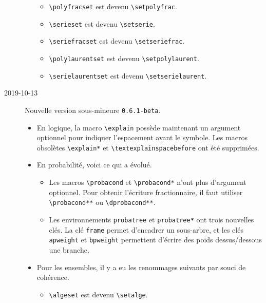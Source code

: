 \documentclass[12pt,a4paper]{article}
\newcommand\env[1]{\texttt{#1}}
\newcommand\macro[1]{\env{\textbackslash{}#1}}
\theoremstyle{definition}
\begin{document}
\begin{description}
\begin{itemize}[itemsep=.5em]
\begin{itemize}[itemsep=.5em]
            \item \macro{polyfracset} est devenu \macro{setpolyfrac}.
    
            \item \macro{serieset} est devenu \macro{setserie}.
    
            \item \macro{seriefracset} est devenu \macro{setseriefrac}.
    
            \item \macro{polylaurentset} est devenu \macro{setpolylaurent}.
    
            \item \macro{serielaurentset} est devenu \macro{setserielaurent}.
        \end{itemize}
    \end{itemize}


    \medskip
    \item[2019-10-13] Nouvelle version sous-mineure \verb+0.6.1-beta+.
    
    \begin{itemize}[itemsep=.5em]
        \item En logique, la macro \macro{explain} possède maintenant un argument optionnel pour indiquer l'espacement avant le symbole. Les macros obsolètes \macro{explain*} et \macro{textexplainspacebefore} ont été supprimées.
    
    
        \item En probabilité, voici ce qui a évolué.
        \begin{itemize}[itemsep=.5em]
            \item Les macros \macro{probacond} et \macro{probacond*} n'ont plus d'argument optionnel. Pour obtenir l'écriture fractionnaire, il faut utiliser \macro{probacond**} ou \macro{dprobacond**}.
    
            \item Les environnements \verb+probatree+ et \verb+probatree*+ ont trois nouvelles clés.
                  La clé \verb+frame+ permet d'encadrer un sous-arbre, et les clés \verb+apweight+ et \verb+bpweight+ permettent d'écrire des poids dessus/dessous une branche.
        \end{itemize}
    
    
        \item Pour les ensembles, il y a eu les renommages suivants par souci de cohérence.
        \begin{itemize}[itemsep=.5em]
            \item \macro{algeset} est devenu \macro{setalge}.
    

\end{itemize}
\end{itemize}
\end{description}
\end{document}
